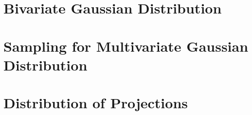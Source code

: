 \documentclass{article}
\begin{document}
\maketitle
\section{Bivariate Gaussian Distribution}

\maketitle
\section{Sampling for Multivariate Gaussian Distribution}

\maketitle
\section{Distribution of Projections}
\end{document}
